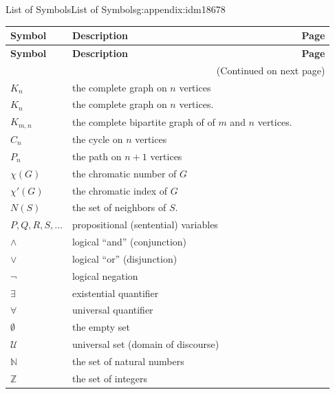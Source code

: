 \documentclass[oneside,10pt,]{book}
\numberwithin{equation}{chapter}
\def\N{\mathbb N}
\def\Z{\mathbb Z}
\def\U{\mathcal U}
\begin{document}
\begin{appendixptx}{List of Symbols}{}{List of Symbols}{}{}{g:appendix:idm18678}
\begin{longtable}[l]{lp{}r}
\addtocounter{table}{-1}
\textbf{Symbol}&\textbf{Description}&\textbf{Page}\\[1em]
\endfirsthead
\textbf{Symbol}&\textbf{Description}&\textbf{Page}\\[1em]
\endhead
\multicolumn{3}{r}{(Continued on next page)}\\
\endfoot
\endlastfoot
\(K_n\)&the complete graph on \(n\) vertices&\pageref{g:notation:idm9040}\\
\(K_n\)&the complete graph on \(n\) vertices.&\pageref{g:notation:idm9093}\\
\(K_{m,n}\)&the complete bipartite graph of of \(m\) and \(n\) vertices.&\pageref{g:notation:idm9103}\\
\(C_n\)&the cycle on \(n\) vertices&\pageref{g:notation:idm9113}\\
\(P_n\)&the path on \(n+1\) vertices&\pageref{g:notation:idm9123}\\
\(\chi(G)\)&the chromatic number of \(G\)&\pageref{g:notation:idm10600}\\
\(\chi'(G)\)&the chromatic index of \(G\)&\pageref{g:notation:idm10989}\\
\(N(S)\)&the set of neighbors of \(S\).&\pageref{g:notation:idm11236}\\
\(
                    P, Q, R, S, \ldots
                \)&propositional (sentential) variables&\pageref{g:notation:idm12075}\\
\(\wedge\)&logical ``and'' (conjunction)&\pageref{g:notation:idm12098}\\
\(\vee\)&logical ``or'' (disjunction)&\pageref{g:notation:idm12113}\\
\(\neg\)&logical negation&\pageref{g:notation:idm12158}\\
\(\exists\)&existential quantifier&\pageref{g:notation:idm12628}\\
\(\forall\)&universal quantifier&\pageref{g:notation:idm12641}\\
\(\emptyset\)&the empty set&\pageref{g:notation:idm13080}\\
\(\U\)&universal set (domain of discourse)&\pageref{g:notation:idm13090}\\
\(\N\)&the set of natural numbers&\pageref{g:notation:idm13098}\\
\(\Z\)&the set of integers&\pageref{g:notation:idm13110}\\

\end{longtable}
\end{appendixptx}
\end{document}
